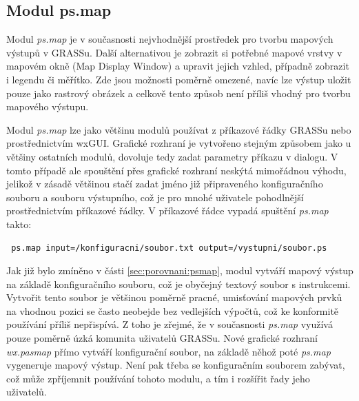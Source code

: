 \documentclass[a4paper,12pt,draft]{article}
\newcommand{\modul}[1]{\emph{#1}}
\begin{document}
\subsection{Modul ps.map}
\label{sec:psmap}
Modul \modul{ps.map} je v současnosti nejvhodnější prostředek pro tvorbu
mapových výstupů v GRASSu. Další alternativou je zobrazit si potřebné
mapové vrstvy v mapovém okně (Map Display Window)  a upravit jejich vzhled,
případně zobrazit i legendu či měřítko. Zde jsou možnosti poměrně
omezené, navíc lze výstup uložit pouze jako rastrový obrázek a celkově
tento způsob není příliš vhodný pro tvorbu mapového výstupu.

Modul \modul{ps.map} lze jako většinu modulů používat z příkazové
řádky GRASSu nebo pro\-střed\-nic\-tvím wxGUI. Grafické rozhraní
je vytvořeno stejným způsobem jako u většiny ostatních modulů,
dovoluje tedy zadat parametry příkazu v dialogu. V tomto případě ale
spouštění přes grafické rozhraní neskýtá mimořádnou výhodu,
jelikož v zásadě většinou stačí zadat jméno již připraveného
konfiguračního souboru a souboru výstupního, což je pro mnohé uživatele
pohodlnější prostřednictvím příkazové řádky. V příkazové řádce
vypadá spuštění \modul{ps.map} takto:
\begin{verbatim}
 ps.map input=/konfiguracni/soubor.txt output=/vystupni/soubor.ps
\end{verbatim}

Jak již bylo zmíněno v části \ref{sec:porovnani:psmap}, modul vytváří
mapový výstup na základě konfiguračního souboru, což je obyčejný
textový soubor s instrukcemi. Vytvořit tento soubor je většinou poměrně
pracné, umisťování mapových prvků na vhodnou pozici se často neobejde
bez vedlejších výpočtů, což ke konformitě používání příliš
nepřispívá. Z toho je zřejmé, že v současnosti \modul{ps.map} využívá
pouze poměrně úzká komunita uživatelů GRASSu. Nové grafické rozhraní
\emph{wx.pasmap} přímo vytváří konfigurační soubor, na základě
něhož poté \modul{ps.map} vygeneruje mapový výstup. Není pak třeba
se konfiguračním souborem zabývat, což může zpříjemnit používání
tohoto modulu, a tím i rozšířit řady jeho uživatelů.
\end{document}

